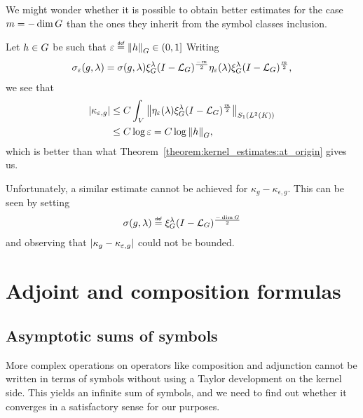 \begin{remark}[Kernel estimates when $m = -\dim \Group$]
    We might wonder whether it is possible to obtain better estimates for the case $m = -\dim \Group$
    than the ones they inherit from the symbol classes inclusion.

    Let $h \in \Group$ be such that $\epsilon \defeq \norm [\Group] h \in (0, 1]$
    Writing
    \begin{align*}
        \sigma_\epsilon(g, \lambda)
        = \sigma(g, \lambda) \Rep \lambda \BesselPotential {-m} \eta_\epsilon(\lambda) \Rep \lambda \BesselPotential {m},
    \end{align*}
    we see that
    \begin{align*}
        \abs {\kappa_{\epsilon, g}}
        &\leq C \int_\VectorSpace \norm [\SchattenClasses 1 {\Lebesgue 2 \CompactGroup}] {\eta_\epsilon(\lambda) \Rep \lambda \BesselPotential m}\\
        &\leq C \log \epsilon = C \log \norm [\Group] h,
    \end{align*}
    which is better than what Theorem~\ref{theorem:kernel_estimates:at_origin} gives us.

    Unfortunately,
    a similar estimate cannot be achieved for $\kappa_g - \kappa_{\epsilon, g}$.
    This can be seen by setting
    \begin{align*}
        \sigma(g, \lambda) \defeq \Rep \lambda \BesselPotential {-\dim \Group}
    \end{align*}
    and observing that
    $\abs {\kappa_g - \kappa_{\epsilon, g}}$ could not be bounded.
\end{remark}

\section{Adjoint and composition formulas}

\subsection{Asymptotic sums of symbols}

More complex operations on operators
like composition and adjunction
cannot be written in terms of symbols without using a Taylor development on the kernel side.
This yields an infinite sum of symbols,
and we need to find out whether it converges in a satisfactory sense for our purposes.

